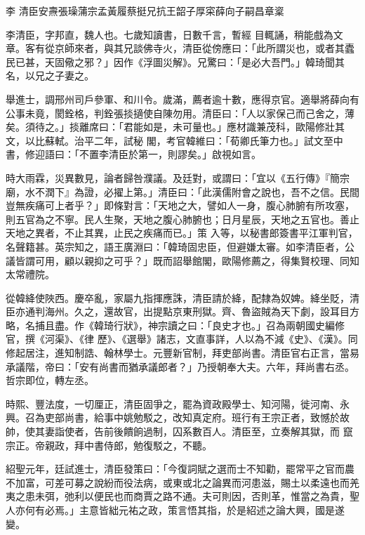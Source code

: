 
\begin{pinyinscope}

 李
 清臣安燾張璪蒲宗孟黃履蔡挺兄抗王韶子厚寀薛向子嗣昌章楶



 李清臣，字邦直，魏人也。七歲知讀書，日數千言，暫經
 目輒誦，稍能戲為文章。客有從京師來者，與其兄談佛寺火，清臣從傍應曰：「此所謂災也，或者其蠹民已甚，天固儆之邪？」因作《浮圖災解》。兄驚曰：「是必大吾門。」韓琦聞其名，以兄之子妻之。



 舉進士，調邢州司戶參軍、和川令。歲滿，薦者逾十數，應得京官。適舉將薛向有公事未竟，閡銓格，判銓張掞擿使自陳勿用。清臣曰：「人以家保己而己舍之，薄矣。須待之。」掞離席曰：「君能如是，未可量也。」應材識兼茂科，歐陽修壯其文，以比蘇軾。治平二年，試秘
 閣，考官韓維曰：「荀卿氏筆力也。」試文至中書，修迎語曰：「不置李清臣於第一，則謬矣。」啟視如言。



 時大雨霖，災異數見，論者歸咎濮議。及廷對，或謂曰：「宜以《五行傳》『簡宗廟，水不潤下』為證，必擢上第。」清臣曰：「此漢儒附會之說也，吾不之信。民間豈無疾痛可上者乎？」即條對言：「天地之大，譬如人一身，腹心肺腑有所攻塞，則五官為之不寧。民人生聚，天地之腹心肺腑也；日月星辰，天地之五官也。善止天地之異者，不止其異，止民之疾痛而已。」策
 入等，以秘書郎簽書平江軍判官，名聲籍甚。英宗知之，語王廣淵曰：「韓琦固忠臣，但避嫌太審。如李清臣者，公議皆謂可用，顧以親抑之可乎？」既而詔舉館閣，歐陽修薦之，得集賢校理、同知太常禮院。



 從韓絳使陜西。慶卒亂，家屬九指揮應誅，清臣請於絳，配隸為奴婢。絳坐貶，清臣亦通判海州。久之，還故官，出提點京東刑獄。齊、魯盜賊為天下劇，設耳目方略，名捕且盡。作《韓琦行狀》，神宗讀之曰：「良史才也。」召為兩朝國史編修官，撰《河渠》、《律
 歷》、《選舉》諸志，文直事詳，人以為不減《史》、《漢》。同修起居注，進知制誥、翰林學士。元豐新官制，拜吏部尚書。清臣官右正言，當易承議階，帝曰：「安有尚書而猶承議郎者？」乃授朝奉大夫。六年，拜尚書右丞。哲宗即位，轉左丞。



 時熙、豐法度，一切厘正，清臣固爭之，罷為資政殿學士、知河陽，徙河南、永興。召為吏部尚書，給事中姚勉駁之，改知真定府。班行有王宗正者，致憾於故帥，使其妻詣使者，告前後饋餉過制，囚系數百人。清臣至，立奏解其獄，而
 竄宗正。帝親政，拜中書侍郎，勉復駁之，不聽。



 紹聖元年，廷試進士，清臣發策曰：「今復詞賦之選而士不知勸，罷常平之官而農不加富，可差可募之說紛而役法病，或東或北之論異而河患滋，賜土以柔遠也而羌夷之患未弭，弛利以便民也而商賈之路不通。夫可則因，否則革，惟當之為貴，聖人亦何有必焉。」主意皆絀元祐之政，策言悟其指，於是紹述之論大興，國是遂變。




\end{pinyinscope}
